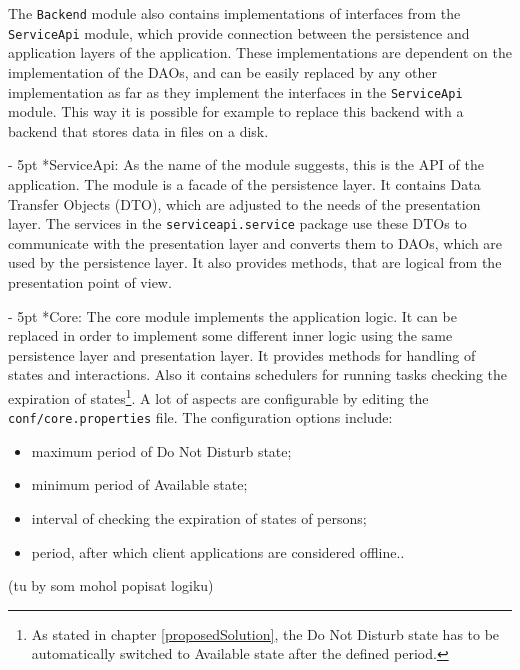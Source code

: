 \documentclass[11pt,singleside]{myfithesis2}
\makeatletter
\renewcommand\paragraph{
   \vspace{-10pt}
   \@startsection{paragraph}{4}{0mm}
      {\baselineskip}
      {- 5pt}
      {\normalfont\normalsize\bfseries}
}
\makeatother
\begin{document}
The \texttt{Backend} module also contains implementations of interfaces from the \texttt{ServiceApi} module, which provide connection between the persistence and application layers of the application. These implementations are dependent on the implementation of the DAOs, and can be easily replaced by any other implementation as far as they implement the interfaces in the \texttt{ServiceApi} module. This way it is possible for example to replace this backend with a backend that stores data in files on a disk.

\paragraph*{ServiceApi: } As the name of the module suggests, this is the API of the application. The module is a facade of the persistence layer. It contains Data Transfer Objects (DTO), which are adjusted to the needs of the presentation layer. The services in the \texttt{serviceapi.service} package use these DTOs to communicate with the presentation layer and converts them to DAOs, which are used by the persistence layer. It also provides methods, that are logical from the presentation point of view.

\paragraph*{Core: } The core module implements the application logic. It can be replaced in order to implement some different inner logic using the same persistence layer and presentation layer. It provides methods for handling of states and interactions. Also it contains schedulers for running tasks checking the expiration of states\footnote{As stated in chapter \ref{proposedSolution}, the Do Not Disturb state has to be automatically switched to Available state after the defined period.}. A lot of aspects are configurable by editing the \texttt{conf/core.properties} file. The configuration options include:
\begin{itemize}
	\item maximum period of Do Not Disturb state;
	\item minimum period of Available state;
	\item interval of checking the expiration of states of persons;
	\item period, after which client applications are considered offline..
\end{itemize}
(tu by som mohol popisat logiku)
\end{document}
